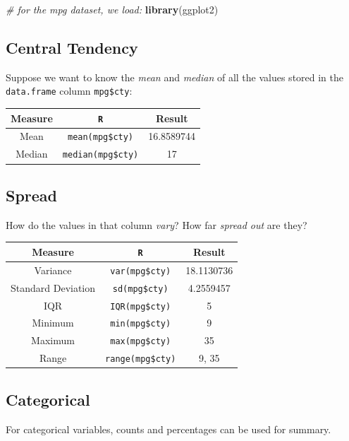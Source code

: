 \documentclass[]{book}
\newenvironment{Shaded}{\begin{snugshade}}{\end{snugshade}}
\newcommand{\KeywordTok}[1]{\textcolor[rgb]{0.13,0.29,0.53}{\textbf{#1}}}
\newcommand{\CommentTok}[1]{\textcolor[rgb]{0.56,0.35,0.01}{\textit{#1}}}
\newcommand{\NormalTok}[1]{#1}
\begin{document}
\begin{Shaded}
\begin{Highlighting}[]
\CommentTok{# for the mpg dataset, we load:}
\KeywordTok{library}\NormalTok{(ggplot2)}
\end{Highlighting}
\end{Shaded}

\subsection*{Central Tendency}\label{central-tendency}

Suppose we want to know the \emph{mean} and \emph{median} of all the
values stored in the \texttt{data.frame} column \texttt{mpg\$cty}:

\begin{longtable}[]{@{}ccc@{}}
\toprule
Measure & \texttt{R} & Result\tabularnewline
\midrule
\endhead
Mean & \texttt{mean(mpg\$cty)} & 16.8589744\tabularnewline
Median & \texttt{median(mpg\$cty)} & 17\tabularnewline
\bottomrule
\end{longtable}

\subsection*{Spread}\label{spread}

How do the values in that column \emph{vary}? How far \emph{spread out}
are they?

\begin{longtable}[]{@{}ccc@{}}
\toprule
Measure & \texttt{R} & Result\tabularnewline
\midrule
\endhead
Variance & \texttt{var(mpg\$cty)} & 18.1130736\tabularnewline
Standard Deviation & \texttt{sd(mpg\$cty)} & 4.2559457\tabularnewline
IQR & \texttt{IQR(mpg\$cty)} & 5\tabularnewline
Minimum & \texttt{min(mpg\$cty)} & 9\tabularnewline
Maximum & \texttt{max(mpg\$cty)} & 35\tabularnewline
Range & \texttt{range(mpg\$cty)} & 9, 35\tabularnewline
\bottomrule
\end{longtable}

\subsection*{Categorical}\label{categorical}

For categorical variables, counts and percentages can be used for
summary.
\end{document}
